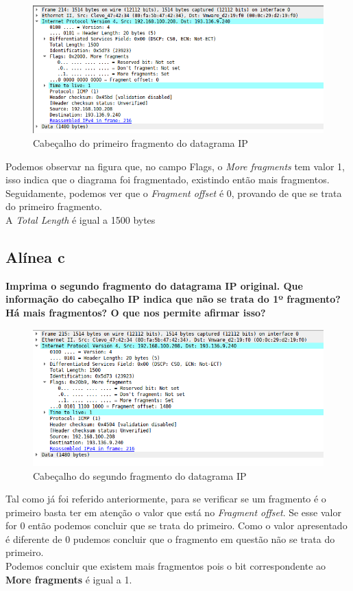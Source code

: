 \documentclass[a4paper]{report}
\begin{document}
\begin{figure}[H]
    \centering 
    \includegraphics[width=\textwidth]{images/fragmentDatagramaIpEx3.png}
    \caption{Cabeçalho do primeiro fragmento do datagrama IP}
    \label{fig:fragmentDatagramaIpEx3}
\end{figure}
Podemos observar na figura que, no campo Flags, o \textit{More fragments} tem
valor 1, isso indica que o diagrama foi fragmentado, existindo então mais
fragmentos.\\
Seguidamente, podemos ver que o \textit{Fragment offset} é 0, provando de que se
trata do primeiro fragmento.\\
A \textit{Total Length} é igual a 1500 bytes

\subsection{Alínea c}
\textbf{Imprima o segundo fragmento do datagrama IP original. Que informação do
cabeçalho IP indica que não se trata do 1º fragmento? Há mais fragmentos? O que
nos permite afirmar isso?}

\begin{figure}[H]
    \centering 
    \includegraphics[width=\textwidth]{images/fragment2DatagramaIpEx3.png}
    \caption{Cabeçalho do segundo fragmento do datagrama IP}
    \label{fig:fragment2DatagramaIpEx3}
\end{figure}
Tal como já foi referido anteriormente, para se verificar se um fragmento é o
primeiro basta ter em atenção o valor que está no \textit{Fragment offset}. Se
esse valor for 0 então podemos concluir que se trata do primeiro. Como o valor
apresentado é diferente de 0 pudemos concluir que o fragmento em questão não se
trata do primeiro.\\
Podemos concluir que existem mais fragmentos pois o bit correspondente ao
\textbf{More fragments} é igual a 1.
\end{document}
